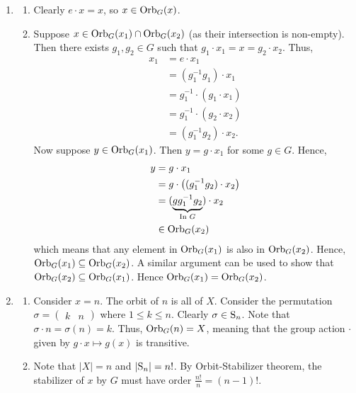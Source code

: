 \begin{enumerate}
	\item \begin{enumerate}[label=(\alph*)]
	    \item Clearly $e \cdot x = x$, so $x \in \mathrm{Orb}_{G}(x)$.
	    \item Suppose $x \in \mathrm{Orb}_{G}(x_1) \cap \mathrm{Orb}_{G}(x_2)$ (as their intersection is non-empty). Then there exists $g_1, g_2 \in G$ such that $g_1\cdot x_1 = x = g_2\cdot x_2$. Thus,
	    \begin{align*}
	        x_1 &= e \cdot x_1\\
	        &= (g_1^{-1}g_1)\cdot x_1\\
	        &= g_1^{-1} \cdot (g_1 \cdot x_1)\\
	        &= g_1^{-1} \cdot (g_2 \cdot x_2)\\
	        &= (g_1^{-1}g_2) \cdot x_2.
	    \end{align*}
	    Now suppose $y \in \mathrm{Orb}_{G}(x_1)$. Then $y = g\cdot x_1$ for some $g \in G$. Hence,
	    \begin{align*}
	        y &= g\cdot x_1 \\
	        &= g \cdot \left((g_1^{-1}g_2) \cdot x_2\right)\\
	        &= (\underbrace{gg_1^{-1}g_2}_{\text{In } G})\cdot x_2\\
	        &\in \mathrm{Orb}_{G}(x_2)
	    \end{align*}
	    which means that any element in $\mathrm{Orb}_{G}(x_1)$ is also in $\mathrm{Orb}_{G}(x_2)$. Hence, $\mathrm{Orb}_{G}(x_1) \subseteq \mathrm{Orb}_{G}(x_2)$. A similar argument can be used to show that $\mathrm{Orb}_{G}(x_2) \subseteq \mathrm{Orb}_{G}(x_1)$. Hence $\mathrm{Orb}_{G}(x_1) = \mathrm{Orb}_{G}(x_2)$.
	\end{enumerate}

	\item \begin{enumerate}[label=(\alph*)]
	    \item Consider $x = n$. The orbit of $n$ is all of $X$. Consider the permutation $\sigma = \begin{pmatrix}k & n\end{pmatrix}$ where $1 \leq k \leq n$. Clearly $\sigma \in \mathrm{S}_{n}$. Note that $\sigma \cdot n = \sigma(n) = k$. Thus, $\mathrm{Orb}_{G}(n) = X$, meaning that the group action $\cdot$ given by $g \cdot x \mapsto g(x)$ is transitive.
	    \item Note that $|X| = n$ and $|\mathrm{S}_{n}| = n!$. By Orbit-Stabilizer theorem, the stabilizer of $x$ by $G$ must have order $\frac{n!}{n} = (n-1)!$.
	\end{enumerate}


\end{enumerate}
